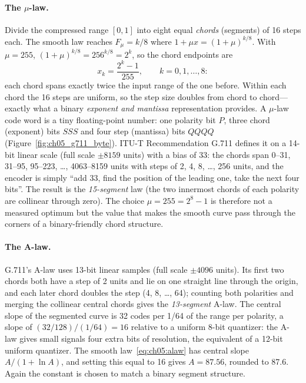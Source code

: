 \paragraph{The $\mu$-law.} Divide the compressed range $[0,1]$ into eight equal \emph{chords}
(segments) of 16 steps each. The smooth law reaches $F_\mu=k/8$ where
$1+\mu x=(1+\mu)^{k/8}$. With $\mu=255$, $(1+\mu)^{k/8}=256^{k/8}=2^k$, so the chord endpoints are
\begin{equation}
x_k=\frac{2^k-1}{255},\qquad k=0,1,\dots,8:
\end{equation}
each chord spans exactly twice the input range of the one before. Within each chord the 16
steps are uniform, so the step size doubles from chord to chord---exactly what a binary
\emph{exponent and mantissa} representation provides. A $\mu$-law code word is a tiny
floating-point number: one polarity bit $P$, three chord (exponent) bits $SSS$ and four step
(mantissa) bits $QQQQ$ (Figure~\ref{fig:ch05_g711_byte}). ITU-T Recommendation G.711 defines it on a
14-bit linear scale (full scale $\pm8159$ units) with a bias of 33: the chords span 0--31, 31--95,
95--223, \dots, 4063--8159 units with steps of 2, 4, 8, \dots, 256 units, and the encoder is simply
``add 33, find the position of the leading one, take the next four bits''. The result is the
\emph{15-segment} law (the two innermost chords of each polarity are collinear through zero).
The choice $\mu=255=2^8-1$ is therefore not a measured optimum but the value that makes the
smooth curve pass through the corners of a binary-friendly chord structure.


\paragraph{The A-law.} G.711's A-law uses 13-bit linear samples (full scale $\pm4096$ units).
Its first two chords both have a step of 2 units and lie on one straight line through the
origin, and each later chord doubles the step (4, 8, \dots, 64); counting both polarities and
merging the collinear central chords gives the \emph{13-segment} A-law. The central slope of
the segmented curve is 32 codes per 1/64 of the range per polarity, a slope of $(32/128)/(1/64)=16$
relative to a uniform 8-bit quantizer: the A-law gives small signals four extra bits of
resolution, the equivalent of a 12-bit uniform quantizer. The smooth law~\eqref{eq:ch05:alaw}
has central slope $A/(1+\ln A)$, and setting this equal to 16 gives $A=87.56$, rounded to
87.6. Again the constant is chosen to match a binary segment structure.

